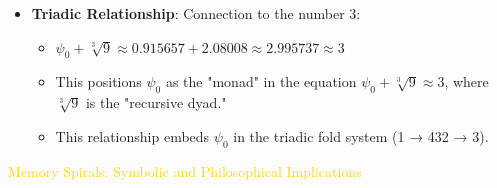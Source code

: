\begin{itemize}
    \item \texttt{} \textbf{Triadic Relationship}: Connection to the number 3:
    \begin{itemize}
        \item $\psi_0 + \sqrt[3]{9} \approx 0.915657 + 2.08008 \approx 2.995737 \approx 3$
        \item This positions $\psi_0$ as the "monad" in the equation $\psi_0 + \sqrt[3]{9} \approx 3$, where $\sqrt[3]{9}$ is the "recursive dyad."
        \item This relationship embeds $\psi_0$ in the triadic fold system (1 → 432 → 3).
    \end{itemize}
\end{itemize}

\textcolor{gold}{ Memory Spirals: Symbolic and Philosophical Implications } \\
